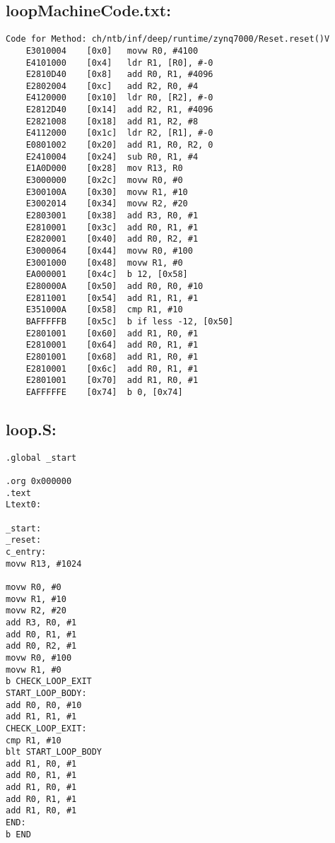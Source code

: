 \subsection{loopMachineCode.txt:}
\label{anhang:loopMachineCode.txt}
\lstset{language=plain}
\begin{lstlisting}
Code for Method: ch/ntb/inf/deep/runtime/zynq7000/Reset.reset()V
	E3010004	[0x0]	movw R0, #4100
	E4101000	[0x4]	ldr R1, [R0], #-0
	E2810D40	[0x8]	add R0, R1, #4096
	E2802004	[0xc]	add R2, R0, #4
	E4120000	[0x10]	ldr R0, [R2], #-0
	E2812D40	[0x14]	add R2, R1, #4096
	E2821008	[0x18]	add R1, R2, #8
	E4112000	[0x1c]	ldr R2, [R1], #-0
	E0801002	[0x20]	add R1, R0, R2, 0
	E2410004	[0x24]	sub R0, R1, #4
	E1A0D000	[0x28]	mov R13, R0
	E3000000	[0x2c]	movw R0, #0
	E300100A	[0x30]	movw R1, #10
	E3002014	[0x34]	movw R2, #20
	E2803001	[0x38]	add R3, R0, #1
	E2810001	[0x3c]	add R0, R1, #1
	E2820001	[0x40]	add R0, R2, #1
	E3000064	[0x44]	movw R0, #100
	E3001000	[0x48]	movw R1, #0
	EA000001	[0x4c]	b 12, [0x58]	
	E280000A	[0x50]	add R0, R0, #10
	E2811001	[0x54]	add R1, R1, #1
	E351000A	[0x58]	cmp R1, #10
	BAFFFFFB	[0x5c]	b if less -12, [0x50]	
	E2801001	[0x60]	add R1, R0, #1
	E2810001	[0x64]	add R0, R1, #1
	E2801001	[0x68]	add R1, R0, #1
	E2810001	[0x6c]	add R0, R1, #1
	E2801001	[0x70]	add R1, R0, #1
	EAFFFFFE	[0x74]	b 0, [0x74]	
\end{lstlisting}


\subsection{loop.S:}
\label{anhang:loop.S}
\begin{lstlisting}
.global _start

.org 0x000000
.text
Ltext0:

_start:
_reset:
c_entry:
movw R13, #1024

movw R0, #0
movw R1, #10
movw R2, #20
add R3, R0, #1
add R0, R1, #1
add R0, R2, #1
movw R0, #100
movw R1, #0
b CHECK_LOOP_EXIT	
START_LOOP_BODY:
add R0, R0, #10
add R1, R1, #1
CHECK_LOOP_EXIT:
cmp R1, #10
blt START_LOOP_BODY
add R1, R0, #1
add R0, R1, #1
add R1, R0, #1
add R0, R1, #1
add R1, R0, #1
END:
b END
\end{lstlisting}



